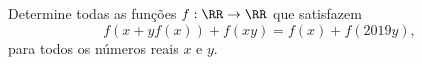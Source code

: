 Determine todas as funções $f:\RR \to \RR$ que satisfazem
$$f(x+yf(x)) + f(xy) = f(x) + f(2019y),$$
para todos os números reais $x$ e $y$.